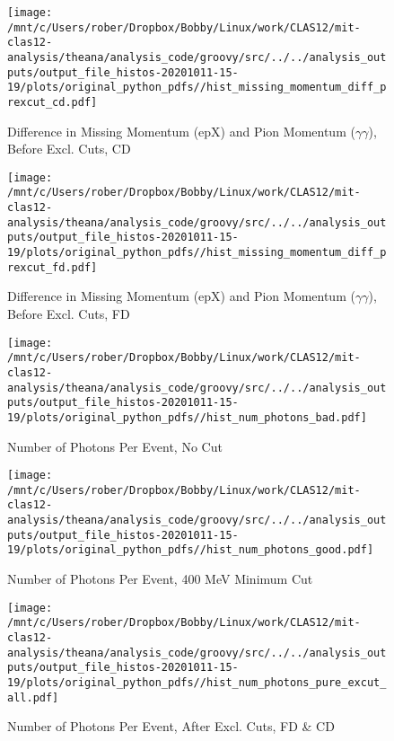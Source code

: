 \documentclass{article}
\begin{document}
\begin{landscape}
\begin{figure}[h]
        \texttt{[image: /mnt/c/Users/rober/Dropbox/Bobby/Linux/work/CLAS12/mit-clas12-analysis/theana/analysis\_code/groovy/src/../../analysis\_outputs/output\_file\_histos-20201011-15-19/plots/original\_python\_pdfs//hist\_missing\_momentum\_diff\_prexcut\_cd.pdf]}
        \captionsetup{textformat=empty,labelformat=blank}
        \caption{Difference in Missing Momentum (epX) and Pion Momentum ($\gamma$$\gamma$), Before Excl. Cuts, CD}
    \end{figure}
    \clearpage
    
    \begin{figure}[h]
        \centering

        \texttt{[image: /mnt/c/Users/rober/Dropbox/Bobby/Linux/work/CLAS12/mit-clas12-analysis/theana/analysis\_code/groovy/src/../../analysis\_outputs/output\_file\_histos-20201011-15-19/plots/original\_python\_pdfs//hist\_missing\_momentum\_diff\_prexcut\_fd.pdf]}
        \captionsetup{textformat=empty,labelformat=blank}
        \caption{Difference in Missing Momentum (epX) and Pion Momentum ($\gamma$$\gamma$), Before Excl. Cuts, FD}
    \end{figure}
    \clearpage
    
    \begin{figure}[h]
        \centering

        \texttt{[image: /mnt/c/Users/rober/Dropbox/Bobby/Linux/work/CLAS12/mit-clas12-analysis/theana/analysis\_code/groovy/src/../../analysis\_outputs/output\_file\_histos-20201011-15-19/plots/original\_python\_pdfs//hist\_num\_photons\_bad.pdf]}
        \captionsetup{textformat=empty,labelformat=blank}
        \caption{Number of Photons Per Event, No Cut}
    \end{figure}
    \clearpage
    
    \begin{figure}[h]
        \centering

        \texttt{[image: /mnt/c/Users/rober/Dropbox/Bobby/Linux/work/CLAS12/mit-clas12-analysis/theana/analysis\_code/groovy/src/../../analysis\_outputs/output\_file\_histos-20201011-15-19/plots/original\_python\_pdfs//hist\_num\_photons\_good.pdf]}
        \captionsetup{textformat=empty,labelformat=blank}
        \caption{Number of Photons Per Event, 400 MeV Minimum Cut}
    \end{figure}
    \clearpage
    
    \begin{figure}[h]
        \centering

        \texttt{[image: /mnt/c/Users/rober/Dropbox/Bobby/Linux/work/CLAS12/mit-clas12-analysis/theana/analysis\_code/groovy/src/../../analysis\_outputs/output\_file\_histos-20201011-15-19/plots/original\_python\_pdfs//hist\_num\_photons\_pure\_excut\_all.pdf]}
        \captionsetup{textformat=empty,labelformat=blank}
        \caption{Number of Photons Per Event, After Excl. Cuts, FD \& CD}
    \end{figure}
    \clearpage
    

\end{landscape}
\end{document}
